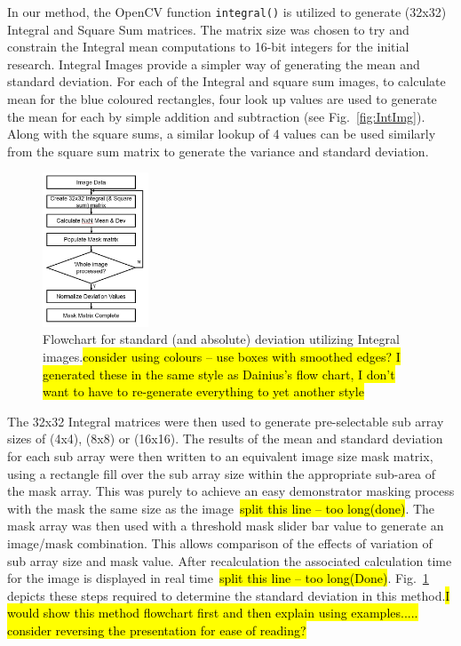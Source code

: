 \documentclass[journal]{IEEEtran}
\begin{document}
In our method, the OpenCV function \texttt{integral()} is utilized to generate (32x32) Integral and Square Sum matrices. The matrix size was chosen to try and constrain the Integral mean computations to 16-bit integers for the initial research. Integral Images provide a simpler way of generating the mean and standard deviation. For each of the Integral and square sum images, to calculate mean for the blue coloured rectangles, four look up values are used to generate the mean for each by simple addition and subtraction (see Fig.~\ref{fig:IntImg}). Along with the square sums, a similar lookup of 4 values can be used similarly from the square sum matrix to generate the variance and standard deviation.
\begin{figure}[htbp]
\centering
    \includegraphics[width=0.28\textwidth]{StdDevFlow.jpg}
    \caption{Flowchart for standard (and absolute) deviation utilizing Integral images.\hl{consider using colours -- use boxes with smoothed edges? I generated these in the same style as Dainius's flow chart, I don't want to have to re-generate everything to yet another style}}
  \label{fig:SDFlow}
\end{figure}

The 32x32 Integral matrices were then used to generate pre-selectable sub array sizes of (4x4), (8x8) or (16x16). The results of the mean and standard deviation for each sub array were then written to an equivalent image size mask matrix, using a rectangle fill over the sub array size within the appropriate sub-area of the mask array. This was purely to achieve an easy demonstrator masking process with the mask the same size as the image~\hl{split this line -- too long(done)}. The mask array was then used with a threshold mask slider bar value to generate an image\slash mask combination. This allows comparison of the effects of variation of sub array size and mask value. After recalculation the associated calculation time for the image is displayed in real time~\hl{split this line -- too long(Done)}. Fig.~\ref{fig:SDFlow} depicts these steps required to determine the standard deviation in this method.\hl{I would show this method flowchart first and then explain using examples..... consider reversing the presentation for ease of reading?}
\end{document}
